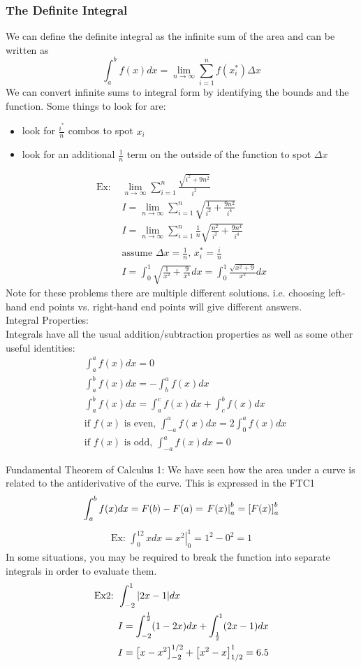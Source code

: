 \documentclass[11pt, fleqn]{article}
\begin{document}
\subsubsection{The Definite Integral}
We can define the definite integral as the infinite sum of the area and can be written as
$$\int_a^bf(x)dx=\lim_{n\to\infty}\sum_{i=1}^nf(x_i^*)\Delta x$$
We can convert infinite sums to integral form by identifying the bounds and the function. Some things to look for are:
\begin{itemize}
    \item look for $\frac{i^*}{n}$ combos to spot $x_i$
    \item look for an additional $\frac{1}{n}$ term on the outside of the function to spot $\Delta x$
\end{itemize}
\begin{align*}
    \text{Ex: }&\lim_{n\to\infty}\sum_{i=1}^n\frac{\sqrt{i^2+9n^2}}{i^2}\\
    &I=\lim_{n\to\infty}\sum_{i=1}^n\sqrt{\frac{1}{i^2}+\frac{9n^2}{i^4}}\\
    &I=\lim_{n\to\infty}\sum_{i=1}^n\frac{1}{n}\sqrt{\frac{n^2}{i^2}+\frac{9n^4}{i^4}}\\
    &\text{assume }\Delta x=\frac{1}{n},\,x_i^*=\frac{i}{n}\\
    &I=\int_0^1\sqrt{\frac{1}{x^2}+\frac{9}{x^4}}dx=\int_0^1\frac{\sqrt{x^2+9}}{x^2}dx
\end{align*}
Note for these problems there are multiple different solutions. i.e. choosing left-hand end points vs. right-hand end points will give different answers.\\

Integral Properties:\\
Integrals have all the usual addition/subtraction properties as well as some other useful identities:
\begin{align*}
    &\int_a^af(x)dx=0\\
    &\int_a^bf(x)dx=-\int_b^af(x)dx\\
    &\int_a^bf(x)dx=\int_a^cf(x)dx+\int_c^bf(x)dx\\
    &\text{if $f(x)$ is even, }\int_{-a}^af(x)dx=2\int_0^af(x)dx\\
    &\text{if $f(x)$ is odd, }\int_{-a}^af(x)dx=0
\end{align*}

Fundamental Theorem of Calculus 1:
We have seen how the area under a curve is related to the antiderivative of the curve. This is expressed in the FTC1
$$\int_a^b f(x)dx=F(b)-F(a)=\left.F(x)\right|^b_a=\left[ F(x) \right]^b_a$$
\begin{align*}
    \text{Ex: }\int_0^12xdx=\left.x^2\right|_0^1=1^2-0^2=1
\end{align*}
In some situations, you may be required to break the function into separate integrals in order to evaluate them.
\begin{align*}
    \text{Ex2: }&\int_{-2}^1|2x-1|dx\\
    &I=\int_{-2}^{\frac{1}{2}}(1-2x)dx+\int_{\frac{1}{2}}^1(2x-1)dx\\
    &I=\left[ x-x^2 \right]_{-2}^{1/2}+\left[ x^2-x \right]_{1/2}^1=6.5
\end{align*}
\end{document}

